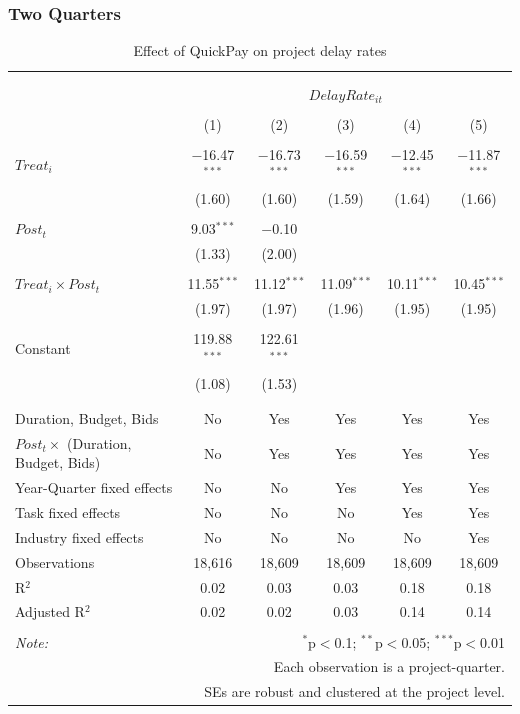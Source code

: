 \documentclass[
]{article}
\begin{document}
\hypertarget{two-quarters-3}{%
\subsubsection{Two Quarters}\label{two-quarters-3}}

\begin{table}[H] \centering 
  \caption{Effect of QuickPay on project delay rates} 
  \label{} 
\small 
\begin{tabular}{@{\extracolsep{-2pt}}lccccc} 
\\[-1.8ex]\hline 
\hline \\[-1.8ex] 
\\[-1.8ex] & \multicolumn{5}{c}{$DelayRate_{it}$} \\ 
\\[-1.8ex] & (1) & (2) & (3) & (4) & (5)\\ 
\hline \\[-1.8ex] 
 $Treat_i$ & $-$16.47$^{***}$ & $-$16.73$^{***}$ & $-$16.59$^{***}$ & $-$12.45$^{***}$ & $-$11.87$^{***}$ \\ 
  & (1.60) & (1.60) & (1.59) & (1.64) & (1.66) \\ 
  & & & & & \\ 
 $Post_t$ & 9.03$^{***}$ & $-$0.10 &  &  &  \\ 
  & (1.33) & (2.00) &  &  &  \\ 
  & & & & & \\ 
 $Treat_i \times Post_t$ & 11.55$^{***}$ & 11.12$^{***}$ & 11.09$^{***}$ & 10.11$^{***}$ & 10.45$^{***}$ \\ 
  & (1.97) & (1.97) & (1.96) & (1.95) & (1.95) \\ 
  & & & & & \\ 
 Constant & 119.88$^{***}$ & 122.61$^{***}$ &  &  &  \\ 
  & (1.08) & (1.53) &  &  &  \\ 
  & & & & & \\ 
\hline \\[-1.8ex] 
Duration, Budget, Bids & No & Yes & Yes & Yes & Yes \\ 
$Post_t \times$  (Duration, Budget, Bids) & No & Yes & Yes & Yes & Yes \\ 
Year-Quarter fixed effects & No & No & Yes & Yes & Yes \\ 
Task fixed effects & No & No & No & Yes & Yes \\ 
Industry fixed effects & No & No & No & No & Yes \\ 
Observations & 18,616 & 18,609 & 18,609 & 18,609 & 18,609 \\ 
R$^{2}$ & 0.02 & 0.03 & 0.03 & 0.18 & 0.18 \\ 
Adjusted R$^{2}$ & 0.02 & 0.02 & 0.03 & 0.14 & 0.14 \\ 
\hline 
\hline \\[-1.8ex] 
\textit{Note:}  & \multicolumn{5}{r}{$^{*}$p$<$0.1; $^{**}$p$<$0.05; $^{***}$p$<$0.01} \\ 
 & \multicolumn{5}{r}{Each observation is a project-quarter.} \\ 
 & \multicolumn{5}{r}{SEs are robust and clustered at the project level.} \\ 
\end{tabular} 
\end{table}
\end{document}
